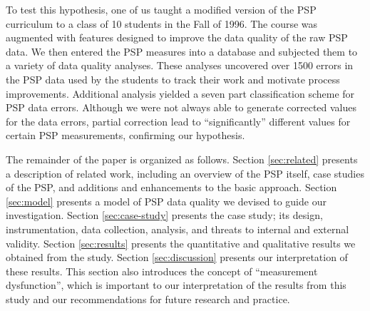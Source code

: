 To test this hypothesis, one of us taught a modified version of the PSP
curriculum to a class of 10 students in the Fall of 1996.  The 
course was augmented
with features designed to improve the data quality of the raw
PSP data.  We then entered the PSP measures into a database and subjected
them to a variety of data quality analyses.  These analyses uncovered over
1500 errors in the PSP data used by the students to track their work and
motivate process improvements.  Additional analysis yielded a seven part
classification scheme for PSP data errors.  Although we were not always
able to generate corrected values for the data errors, partial correction
lead to ``significantly'' different values for certain PSP measurements,
confirming our hypothesis.

The remainder of the paper is organized as follows.  Section
\ref{sec:related} presents a description of related work, including an
overview of the PSP itself, case studies of the PSP, and additions and
enhancements to the basic approach.  Section \ref{sec:model} presents a
model of PSP data quality we devised to guide our investigation.  Section
\ref{sec:case-study} presents the case study; its design, instrumentation,
data collection, analysis, and threats to internal and external validity.
Section \ref{sec:results} presents the quantitative and qualitative results
we obtained from the study.  Section \ref{sec:discussion} presents our
interpretation of these results.  This section also introduces the concept
of ``measurement dysfunction'', which is important to our interpretation of
the results from this study and our recommendations for future research and
practice.









